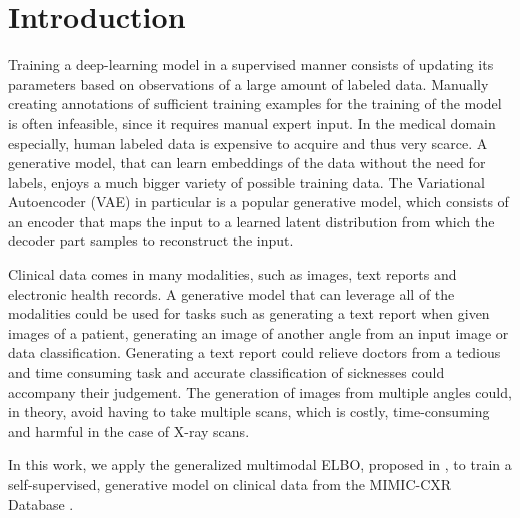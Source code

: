 \section{Introduction}

	Training a deep-learning model in a supervised manner consists of updating its parameters based on observations of a large amount of labeled data.
	Manually creating annotations of sufficient training examples for the training of the model is often infeasible, since it requires manual expert input.
	In the medical domain especially, human labeled data is expensive to acquire and thus very scarce.
	A generative model, that can learn embeddings of the data without the need for labels, enjoys a much bigger variety of possible training data.
	The Variational Autoencoder (VAE) \cite{doersch2016tutorial} in particular is a popular generative model, which consists of an encoder that maps the input to a learned latent distribution from which the decoder part samples to reconstruct the input.

	Clinical data comes in many modalities, such as images, text reports and electronic health records.
	A generative model that can leverage all of the modalities could be used for tasks such as generating a text report when given images of a patient, generating an image of another angle from an input image or data classification.
	Generating a text report could relieve doctors from a tedious and time consuming task and accurate classification of sicknesses could accompany their judgement.
	The generation of images from multiple angles could, in theory, avoid having to take multiple scans, which is costly, time-consuming and harmful in the case of X-ray scans.

	In this work, we apply the generalized multimodal ELBO, proposed in \cite{thomas_gener-ELBO}, to train a self-supervised, generative model on clinical data from the MIMIC-CXR Database \cite{johnson2019mimic}.

